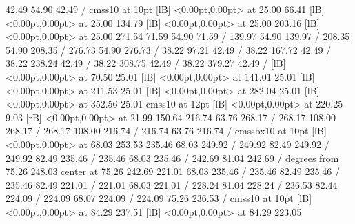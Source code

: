 { 42.49 54.90 42.49 /
\font\picfont cmss10 at 10pt\picfont
{}  [lB] <0.00pt,0.00pt> at 25.00 66.41
  [lB] <0.00pt,0.00pt> at 25.00 134.79
  [lB] <0.00pt,0.00pt> at 25.00 203.16
  [lB] <0.00pt,0.00pt> at 25.00 271.54
\setsolid
{} 71.59 54.90 71.59 /
\setsolid
{} 139.97 54.90 139.97 /
\setsolid
{} 208.35 54.90 208.35 /
\setsolid
{} 276.73 54.90 276.73 /
\setsolid
{} 38.22 97.21 42.49 /
\setsolid
{} 38.22 167.72 42.49 /
\setsolid
{} 38.22 238.24 42.49 /
\setsolid
{} 38.22 308.75 42.49 /
\setsolid
{} 38.22 379.27 42.49 /
  [lB] <0.00pt,0.00pt> at 70.50 25.01
  [lB] <0.00pt,0.00pt> at 141.01 25.01
  [lB] <0.00pt,0.00pt> at 211.53 25.01
  [lB] <0.00pt,0.00pt> at 282.04 25.01
  [lB] <0.00pt,0.00pt> at 352.56 25.01
\font\picfont cmss10 at 12pt\picfont
{}  [lB] <0.00pt,0.00pt> at 220.25 9.03
 [rB] <0.00pt,0.00pt> at 21.99 150.64
\setsolid
{} 216.74 63.76 268.17 /
 268.17 108.00 268.17 /
 268.17 108.00 216.74 /
 216.74 63.76 216.74 /
\font\picfont cmssbx10 at 10pt\picfont
{}  [lB] <0.00pt,0.00pt> at 68.03 253.53
\setsolid
{} 235.46 68.03 249.92 /
 249.92 82.49 249.92 /
 249.92 82.49 235.46 /
 235.46 68.03 235.46 /
\setsolid
{} 242.69 81.04 242.69 /
 degrees from 75.26 248.03 center at 75.26 242.69
\setsolid
{} 221.01 68.03 235.46 /
 235.46 82.49 235.46 /
 235.46 82.49 221.01 /
 221.01 68.03 221.01 /
\setsolid
{} 228.24 81.04 228.24 /
\setsolid
{} 236.53 82.44 224.09 /
 224.09 68.07 224.09 /
 224.09 75.26 236.53 /
\font\picfont cmss10 at 10pt\picfont
{}  [lB] <0.00pt,0.00pt> at 84.29 237.51
  [lB] <0.00pt,0.00pt> at 84.29 223.05
\endpicture
}
